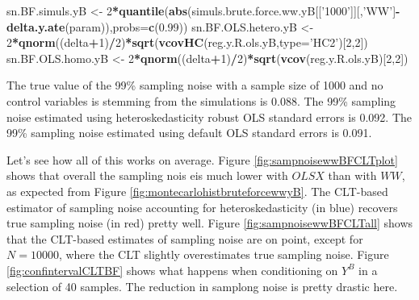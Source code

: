 \documentclass[]{book}
\newenvironment{Shaded}{\begin{snugshade}}{\end{snugshade}}
\newcommand{\DataTypeTok}[1]{\textcolor[rgb]{0.13,0.29,0.53}{#1}}
\newcommand{\DecValTok}[1]{\textcolor[rgb]{0.00,0.00,0.81}{#1}}
\newcommand{\FloatTok}[1]{\textcolor[rgb]{0.00,0.00,0.81}{#1}}
\newcommand{\KeywordTok}[1]{\textcolor[rgb]{0.13,0.29,0.53}{\textbf{#1}}}
\newcommand{\NormalTok}[1]{#1}
\newcommand{\OperatorTok}[1]{\textcolor[rgb]{0.81,0.36,0.00}{\textbf{#1}}}
\newcommand{\StringTok}[1]{\textcolor[rgb]{0.31,0.60,0.02}{#1}}
\theoremstyle{definition}
\theoremstyle{definition}
\theoremstyle{definition}
\theoremstyle{remark}
\begin{document}
\begin{Shaded}
\begin{Highlighting}[]
\NormalTok{sn.BF.simuls.yB <-}\StringTok{ }\DecValTok{2}\OperatorTok{*}\KeywordTok{quantile}\NormalTok{(}\KeywordTok{abs}\NormalTok{(simuls.brute.force.ww.yB[[}\StringTok{'1000'}\NormalTok{]][,}\StringTok{'WW'}\NormalTok{]}\OperatorTok{-}\KeywordTok{delta.y.ate}\NormalTok{(param)),}\DataTypeTok{probs=}\KeywordTok{c}\NormalTok{(}\FloatTok{0.99}\NormalTok{))}
\NormalTok{sn.BF.OLS.hetero.yB <-}\StringTok{ }\DecValTok{2}\OperatorTok{*}\KeywordTok{qnorm}\NormalTok{((delta}\OperatorTok{+}\DecValTok{1}\NormalTok{)}\OperatorTok{/}\DecValTok{2}\NormalTok{)}\OperatorTok{*}\KeywordTok{sqrt}\NormalTok{(}\KeywordTok{vcovHC}\NormalTok{(reg.y.R.ols.yB,}\DataTypeTok{type=}\StringTok{'HC2'}\NormalTok{)[}\DecValTok{2}\NormalTok{,}\DecValTok{2}\NormalTok{])}
\NormalTok{sn.BF.OLS.homo.yB <-}\StringTok{ }\DecValTok{2}\OperatorTok{*}\KeywordTok{qnorm}\NormalTok{((delta}\OperatorTok{+}\DecValTok{1}\NormalTok{)}\OperatorTok{/}\DecValTok{2}\NormalTok{)}\OperatorTok{*}\KeywordTok{sqrt}\NormalTok{(}\KeywordTok{vcov}\NormalTok{(reg.y.R.ols.yB)[}\DecValTok{2}\NormalTok{,}\DecValTok{2}\NormalTok{])}
\end{Highlighting}
\end{Shaded}

The true value of the 99\% sampling noise with a sample size of 1000 and no control variables is stemming from the simulations is 0.088.
The 99\% sampling noise estimated using heteroskedasticity robust OLS standard errors is 0.092.
The 99\% sampling noise estimated using default OLS standard errors is 0.091.

Let's see how all of this works on average.
Figure \ref{fig:sampnoisewwBFCLTplot} shows that overall the sampling nois eis much lower with \(OLSX\) than with \(WW\), as expected from Figure \ref{fig:montecarlohistbruteforcewwyB}.
The CLT-based estimator of sampling noise accounting for heteroskedasticity (in blue) recovers true sampling noise (in red) pretty well.
Figure \ref{fig:sampnoisewwBFCLTall} shows that the CLT-based estimates of sampling noise are on point, except for \(N=10000\), where the CLT slightly overestimates true sampling noise.
Figure \ref{fig:confintervalCLTBF} shows what happens when conditioning on \(Y^B\) in a selection of 40 samples.
The reduction in samplong noise is pretty drastic here.
\end{document}
